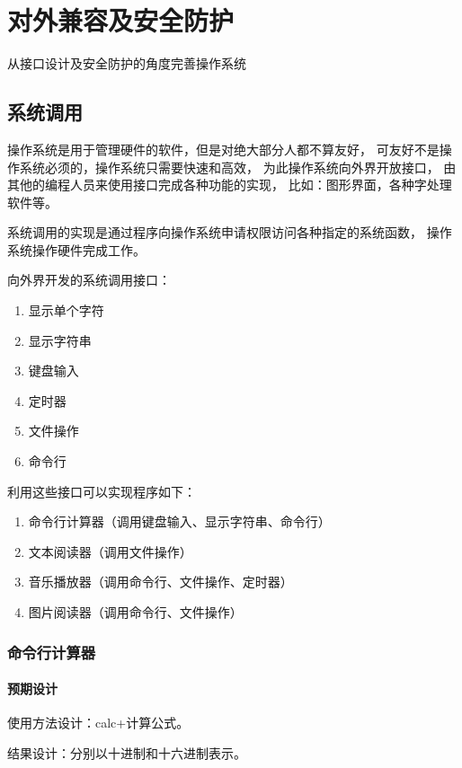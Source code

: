 \chapter{对外兼容及安全防护}

从接口设计及安全防护的角度完善操作系统

\section{系统调用}

操作系统是用于管理硬件的软件，但是对绝大部分人都不算友好，
可友好不是操作系统必须的，操作系统只需要快速和高效，
为此操作系统向外界开放接口，
由其他的编程人员来使用接口完成各种功能的实现，
比如：图形界面，各种字处理软件等。

系统调用的实现是通过程序向操作系统申请权限访问各种指定的系统函数，
操作系统操作硬件完成工作。

向外界开发的系统调用接口：
\begin{enumerate}
    \item 显示单个字符
    \item 显示字符串
    \item 键盘输入
    \item 定时器
    \item 文件操作
    \item 命令行
\end{enumerate}

利用这些接口可以实现程序如下：
\begin{enumerate}
    \item 命令行计算器（调用键盘输入、显示字符串、命令行）
    \item 文本阅读器（调用文件操作）
    \item 音乐播放器（调用命令行、文件操作、定时器）
    \item 图片阅读器（调用命令行、文件操作）
\end{enumerate}

\subsection{命令行计算器}

    \subsubsection{预期设计}

    使用方法设计：calc+计算公式。

    结果设计：分别以十进制和十六进制表示。

